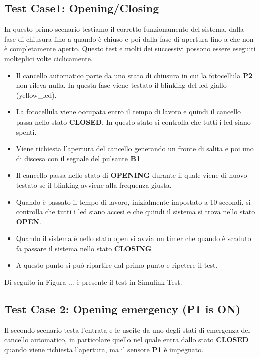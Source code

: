 \documentclass[12pt]{article}
\begin{document}
\subsection{Test Case1: Opening/Closing}
In questo primo scenario testiamo il corretto funzionamento del sistema, dalla fase di chiusura fino a quando è chiuso e poi dalla fase di apertura fino a che non è completamente aperto. Questo test e molti dei successivi possono essere eseguiti molteplici volte ciclicamente.

\begin{itemize}
    \item Il cancello automatico parte da uno stato di chiusura in cui la fotocellula \textbf{P2} non rileva nulla. In questa fase viene testato il blinking del led giallo (yellow\_led).
    \item La fotocellula viene occupata entro il tempo di lavoro e quindi il cancello passa nello stato \textbf{CLOSED}. In questo stato si controlla che tutti i led siano spenti.
    \item Viene richiesta l'apertura del cancello generando un fronte di salita e poi uno di discesa con il segnale del pulsante \textbf{B1}
    \item Il cancello passa nello stato di \textbf{OPENING} durante il quale viene di nuovo testato se il blinking avviene alla frequenza giusta.
    \item Quando è passato il tempo di lavoro, inizialmente impostato a 10 secondi, si controlla che tutti i led siano accesi e che quindi il sistema si trova nello stato \textbf{OPEN}.
    \item Quando il sistema è nello stato open si avvia un timer che quando è scaduto fa passare il sistema nello stato \textbf{CLOSING}
    \item A questo punto si può ripartire dal primo punto e ripetere il test.
\end{itemize}

Di seguito in Figura ... è presente il test in Simulink Test.

\subsection{Test Case 2: Opening emergency (P1 is ON)}

Il secondo scenario testa l'entrata e le uscite da uno degli stati di emergenza del cancello automatico, in particolare quello nel quale entra dallo stato \textbf{CLOSED} quando viene richiesta l'apertura, ma il sensore \textbf{P1} è impegnato.
\end{document}
